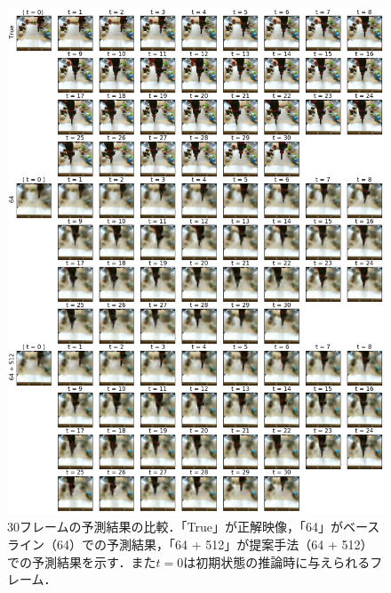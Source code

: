 \begin{figure}[tbp]
    \begin{center}
        \includegraphics[width=0.95\linewidth]{./figures/pred_long.png}
        \caption[30フレームの予測結果の比較]{30フレームの予測結果の比較．「True」が正解映像，「64」がベースライン（64）での予測結果，「64 + 512」が提案手法（64 + 512）での予測結果を示す．また$t = 0$は初期状態の推論時に与えられるフレーム．}
        \label{fig:pred_long}
    \end{center}
\end{figure}



